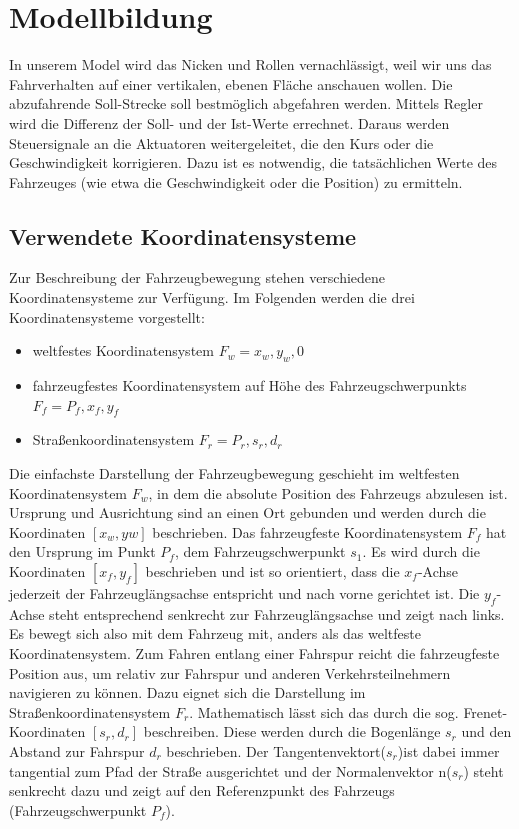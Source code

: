 \chapter{Modellbildung}
\label{chap:modellbildung}
In unserem Model wird das Nicken und Rollen vernachlässigt, weil wir uns das Fahrverhalten auf einer vertikalen, ebenen Fläche anschauen wollen. 
Die abzufahrende Soll-Strecke soll bestmöglich abgefahren werden. Mittels Regler wird die Differenz der Soll- und der Ist-Werte errechnet. Daraus werden Steuersignale an die Aktuatoren weitergeleitet, die den Kurs oder die Geschwindigkeit korrigieren. Dazu ist es notwendig, die tatsächlichen Werte des Fahrzeuges (wie etwa die Geschwindigkeit oder die Position) zu ermitteln.  

\section{Verwendete Koordinatensysteme}
Zur Beschreibung der Fahrzeugbewegung stehen verschiedene Koordinatensysteme zur Verfügung. Im Folgenden werden die drei Koordinatensysteme vorgestellt: 
\begin{itemize}
\item weltfestes Koordinatensystem $F_w ={x_w,y_w,0}$ 
\item fahrzeugfestes Koordinatensystem auf Höhe des Fahrzeugschwerpunkts $F_f ={P_f,x_f,y_f}$
\item Straßenkoordinatensystem $F_r ={P_r,s_r,d_r}$ 
\end{itemize}
Die einfachste Darstellung der Fahrzeugbewegung geschieht im weltfesten Koordinatensystem $F_w$, in dem die absolute Position des Fahrzeugs abzulesen ist. Ursprung und Ausrichtung sind an einen Ort gebunden und werden durch die Koordinaten $[x_w,yw]$ beschrieben. Das fahrzeugfeste Koordinatensystem $F_f$ hat den Ursprung im Punkt $P_f$, dem Fahrzeugschwerpunkt $s_1$. Es wird durch die Koordinaten $[x_f,y_f]$ beschrieben und ist so orientiert, dass die $x_f$-Achse jederzeit der Fahrzeuglängsachse entspricht und nach vorne gerichtet ist. Die $y_f$-Achse steht entsprechend senkrecht zur Fahrzeuglängsachse und zeigt nach links. Es bewegt sich also mit dem Fahrzeug mit, anders als das weltfeste Koordinatensystem. 
Zum Fahren entlang einer Fahrspur reicht die fahrzeugfeste Position aus, um relativ zur Fahrspur und anderen Verkehrsteilnehmern navigieren zu können. Dazu eignet sich die Darstellung im Straßenkoordinatensystem $F_r$. Mathematisch lässt sich das durch die sog. Frenet-Koordinaten $[s_r,d_r]$ beschreiben. Diese werden durch die Bogenlänge $s_r$ und den Abstand zur Fahrspur $d_r$ beschrieben. Der Tangentenvektort($s_r$)ist dabei immer tangential zum Pfad der Straße ausgerichtet und der Normalenvektor n($s_r$) steht senkrecht dazu und zeigt auf den Referenzpunkt des Fahrzeugs (Fahrzeugschwerpunkt $P_f$).


